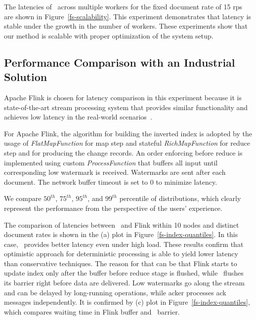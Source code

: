 The latencies of \FlameStream\ across multiple workers for the fixed document rate of 15 rps are shown in Figure~\ref{fs-scalability}. 
This experiment demonstrates that latency is stable  under  the growth in the number of workers.
%
These experiments show that our method is scalable with proper  optimization of  the system setup.

\subsection{Performance Comparison with an Industrial Solution}

Apache Flink is chosen for latency comparison in this experiment  because it is state-of-the-art stream processing system that provides similar functionality 
and achieves low latency in the real-world scenarios~\cite{S7530084}. 

For Apache Flink, the algorithm for building the inverted index is 
adopted 
by the usage of {\it FlatMapFunction} for map step and stateful {\it RichMapFunction} for reduce step and for producing the change records. 
An order enforcing before reduce is implemented using custom {\it ProcessFunction} that buffers all input until corresponding low watermark is received. Watermarks are sent after each document. The network buffer timeout is set to 0 to minimize latency.

We compare $50^{th}$, $75^{th}$, $95^{th}$, and $99^{th}$ percentile of distributions, which clearly represent the performance from the perspective of the users' experience.

The comparison of latencies between \FlameStream\ and Flink within 10 nodes and distinct document rates is shown in the (a) plot in Figure~\ref{fs-index-quantiles}. 
In this case, \FlameStream\ provides better  latency even under high load. 
These results confirm that optimistic approach for deterministic processing is able to yield  lower  latency than conservative techniques. 
The  reason for that  can be that Flink starts to update index only after the buffer before reduce stage is flushed, 
while  \FlameStream\ flushes its barrier right before data are delivered.
Low watermarks go along the stream and can be delayed by long-running operations, while acker processes ack messages independently. It is confirmed by (c) plot in Figure~\ref{fs-index-quantiles}, which compares  waiting time in Flink buffer and \FlameStream\ barrier.

